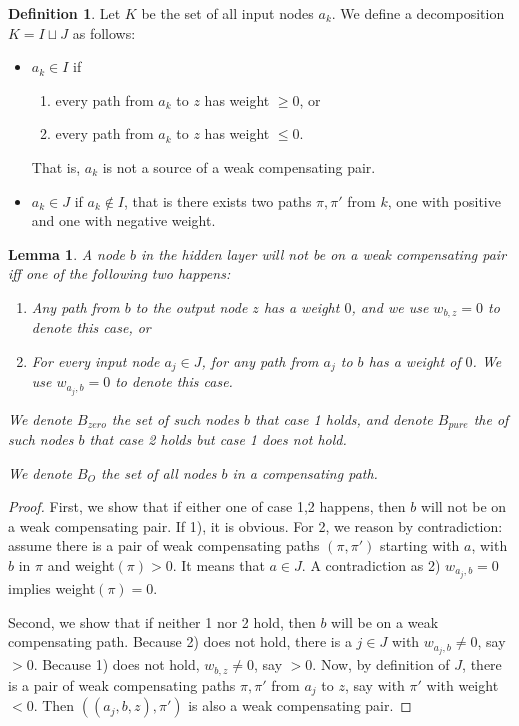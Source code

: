 \documentclass[]{article}
\newtheorem{lemma}{Lemma}
\theoremstyle{definition}
\newtheorem{definition}{Definition}
\begin{document}
\begin{definition}
	Let $K$ be the set of  all input nodes $a_k$. 
	We define a decomposition $K=I\sqcup J$ as follows:  
	\begin{itemize}
		\item $a_k \in I$  if
		\begin{enumerate}
			\item every path from $a_k$ to $z$ has weight $\geq 0$, or
			\item every path from $a_k$ to $z$ has weight $\leq 0$.
		\end{enumerate}
		That is, $a_k$ is not a source of a weak compensating pair.
		\item $a_k \in J$ if $a_k \notin I$, that is there exists two paths $\pi,\pi'$ from $k$, 
		one with positive and one with negative weight.
	\end{itemize}
\end{definition} 



\begin{lemma} \label{lem:open_node_2}
	A node $b$ in the hidden layer will not be on a weak compensating pair iff one of the following two happens:
	\begin{enumerate}
		\item Any path from $b$ to the output node $z$ has a weight $0$, and we use $w_{b,z}=0$ to denote this case, or
		\item For every input node $a_j\in J$, for any path from $a_j$ to $b$ has a weight of $0$. We use $w_{a_j,b}=0$ to denote this case.
	\end{enumerate}
	We denote $B_{zero}$ the set of such nodes $b$ that case 1 holds, and denote $B_{pure}$ the of such nodes $b$ that case 2 holds but case 1 does not hold.
	
	We denote $B_O$ the set of all nodes $b$ in a compensating path.
\end{lemma}

\begin{proof}
	First, we show that if either one of case 1,2 happens, then $b$ will not be on a weak compensating pair. If 1), it is obvious. For 2, we reason by contradiction: assume there is a pair of weak compensating paths 	$(\pi,\pi')$ starting with $a$, with $b$ in $\pi$ and weight$(\pi) > 0$. It means that $a \in J$. A contradiction as 2) $w_{a_j,b}=0$ implies weight$(\pi)=0$.
	
	Second, we show that if neither 1 nor 2 hold, then $b$ will be on a weak compensating path.
	Because 2) does not hold, there is a $j \in J$ with $w_{a_j,b} \neq 0$, say $>0$.
	Because 1) does not hold, $w_{b,z} \neq 0$, say $>0$.
	Now, by definition of $J$, there is a pair of weak compensating paths $\pi,\pi'$ 
	from $a_j$ to $z$, say with $\pi'$ with weight $<0$.
	Then $((a_j,b,z), \pi')$ is also a weak compensating pair.
\end{proof}
\end{document}
